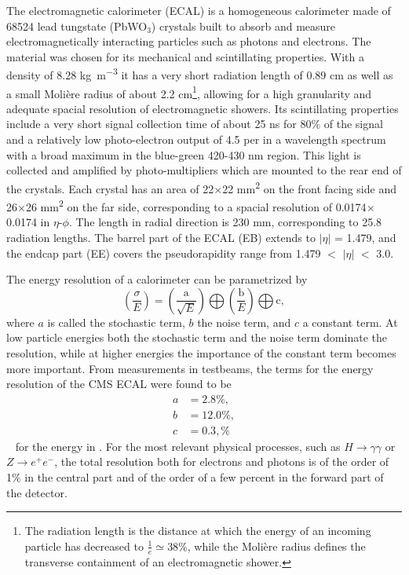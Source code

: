 The electromagnetic calorimeter (ECAL) is a homogeneous calorimeter made of \num{68524} lead tungstate (PbWO$_3$) crystals built to absorb and measure 
electromagnetically interacting particles such as photons and electrons. The material was chosen
for its mechanical and scintillating properties. With a density of 8.28 \si{\kilo\gram\per\cubic\meter} it has a very short radiation length of
0.89 \si{\centi\meter} as well as a small Moli\`{e}re radius of about 2.2 \si{\centi\meter}\footnote{The radiation length is the distance at which 
the energy of an incoming particle has decreased to $\frac{1}{e}\simeq$38\%, while the Moli\`{e}re radius defines the transverse containment of an 
electromagnetic shower.}, allowing for a high granularity and adequate spacial resolution of electromagnetic showers. Its scintillating properties
include a very short signal collection time of about 25 \si{\nano\second} for 80\% of the signal and a relatively low photo-electron output of
4.5 per \mev in a wavelength spectrum with a broad maximum in the blue-green 420-430 \si{\nano\meter} region. This light is collected
and amplified by photo-multipliers which are mounted to the rear end of the crystals.
Each crystal has an area of 22$\times$22 \si{\square\milli\meter} on the front facing side and 26$\times$26 
\si{\square\milli\meter} on the far side, corresponding to a spacial resolution of 0.0174$\times$0.0174 in  $\eta$-$\phi$. The length 
in radial direction is 230 \si{\milli\meter}, corresponding to \num{25.8} radiation lengths. The barrel part of the ECAL (EB) extends to 
$|\eta|$ = 1.479, and the endcap part (EE) covers the pseudorapidity range from 1.479 $<$ $|\eta|$ $<$ 3.0.

The energy resolution of a calorimeter can be parametrized by
\begin{equation}
\label{eq:calo_res}
    \left( \frac{\sigma}{E} \right) =   \left( \frac{\text{a}}{\sqrt{E}} \right)   \bigoplus  \left( \frac{\text{b}}{E} \right)  \bigoplus  \text{c} ,
\end{equation}
where $a$ is called the stochastic term, $b$ the noise term, and $c$ a constant term. At low particle energies both the stochastic term and the 
noise term dominate the resolution, while at higher energies the importance of the constant term becomes more important.
From measurements in testbeams, the terms for the energy resolution of the CMS ECAL were found to be
\begin{eqnarray*}
    a &= 2.8 \%, \\
    b &= 12.0 \%, \\
    c &= 0.3, \% 
\end{eqnarray*}
~\cite{ecalresolution} for the energy in \gev. For the most relevant physical processes, such as $H\rightarrow\gamma\gamma$ or $Z\rightarrow e^+e^-$, the total resolution
both for electrons and photons is of the order of 1\% in the central part and of the order of a few percent in the
forward part of the detector.

